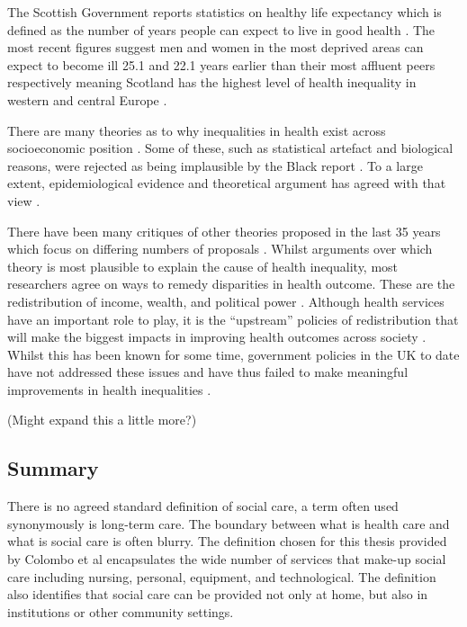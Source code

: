 \documentclass[12pt,]{report}
\begin{document}
The Scottish Government reports statistics on healthy life expectancy
which is defined as the number of years people can expect to live in
good health \citep{RN315}. The most recent figures suggest men and women
in the most deprived areas can expect to become ill 25.1 and 22.1 years
earlier than their most affluent peers respectively \citep{RN315}
meaning Scotland has the highest level of health inequality in western
and central Europe \citep{RN385, RN386}.

There are many theories as to why inequalities in health exist across
socioeconomic position \citep{RN327, RN333}. Some of these, such as
statistical artefact and biological reasons, were rejected as being
implausible by the Black report \citep{RN277}. To a large extent,
epidemiological evidence and theoretical argument has agreed with that
view \citep{RN327, RN83, RN82, RN333}.

There have been many critiques of other theories proposed in the last 35
years which focus on differing numbers of proposals
\citep{RN327, RN333, RN377, RN378, RN83}. Whilst arguments over which
theory is most plausible to explain the cause of health inequality, most
researchers agree on ways to remedy disparities in health outcome. These
are the redistribution of income, wealth, and political power
\citep{RN378, RN391, RN327, RN333}. Although health services have an
important role to play, it is the ``upstream'' policies of
redistribution that will make the biggest impacts in improving health
outcomes across society \citep{RN378, RN391, RN327, RN325}. Whilst this
has been known for some time, government policies in the UK to date have
not addressed these issues and have thus failed to make meaningful
improvements in health inequalities \citep{RN330, RN331, RN377}.

(Might expand this a little more?)

\subsection{Summary}\label{subsec:access-sc-summary}

There is no agreed standard definition of social care, a term often used
synonymously is long-term care. The boundary between what is health care
and what is social care is often blurry. The definition chosen for this
thesis provided by Colombo et al \citep{RN414} encapsulates the wide
number of services that make-up social care including nursing, personal,
equipment, and technological. The definition also identifies that social
care can be provided not only at home, but also in institutions or other
community settings.
\end{document}
